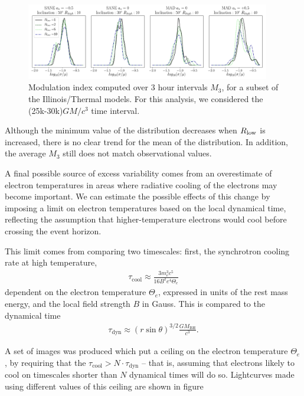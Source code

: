 \begin{figure}
\centering
\includegraphics[width=0.95\textwidth]{figures/mi_rlow_select_models.png}
\caption{Modulation index computed over 3 hour intervals $M_{3}$, for a subset of the Illinois/Thermal models. For this analysis, we considered the (25k-30k)$GM/c^{3}$ time interval.}
\label{fig:mi_rlow}
\end{figure}

Although the minimum value of the distribution decreases when $R_\mathrm{low}$ is increased, there is no clear trend for the mean of the distribution. In addition, the average $M_{3}$ still does not match observational values.



A final possible source of excess variability comes from an overestimate of electron temperatures in areas where radiative cooling of the electrons may become important. We can estimate the possible effects of this change by imposing a limit on electron temperatures based on the local dynamical time, reflecting the assumption that higher-temperature electrons would cool before crossing the event horizon.

This limit comes from comparing two timescales: first, the synchrotron cooling rate at high temperature,
\begin{align}
    \tau_\mathrm{cool} \approx \frac{3 m_e^3 c^5}{16 B^2 e^4 \Theta_e}
\end{align}
dependent on the electron temperature $\Theta_e$, expressed in units of the rest mass energy, and the local field strength $B$ in Gauss.  This is compared to the dynamical time
\begin{align}
    \tau_\mathrm{dyn} \approx \left( r \sin{\theta} \right) ^{3/2} \frac{G M_\mathrm{BH}}{c^3}.
\end{align}

A set of images was produced which put a ceiling on the electron temperature $\Theta_e$, by requiring that the $\tau_\mathrm{cool} > N \cdot \tau_\mathrm{dyn}$ -- that is, assuming that electrons likely to cool on timescales shorter than $N$ dynamical times will do so. Lightcurves made using different values of this ceiling are shown in figure

